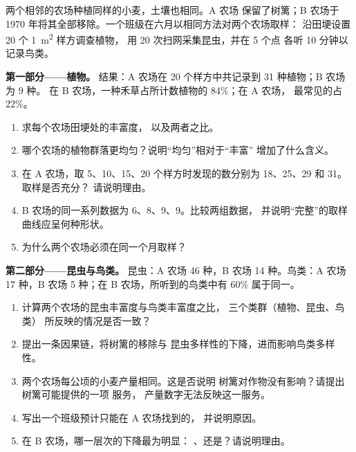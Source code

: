 \begin{problem}
\label{pb:g10:biodiversity-scales:1}
两个相邻的农场种植同样的小麦，土壤也相同。A 农场
保留了树篱；B 农场于 1970 年将其全部移除。一个班级在六月以相同方法对两个农场取样：
沿田埂设置 20 个 \qty{1}{m^2} 样方调查植物，
用 20 次扫网采集昆虫，并在 5 个点
各听 10 分钟以记录鸟类。

\medskip
\noindent\textbf{第一部分——植物。}
结果：A 农场在 20 个样方中共记录到 31 种植物；B 农场为 9 种。
在 B 农场，一种禾草占所计数植物的 84\%；在 A 农场，
最常见的占 22\%。
\begin{enumerate}
  \item 求每个农场田埂处的丰富度，
        以及两者之比。
  \item 哪个农场的植物群落更均匀？说明“均匀”相对于“丰富”
        增加了什么含义。
  \item 在 A 农场，取 5、10、15、20 个样方时发现的数分别为
        18、25、29 和 31。取样是否充分？
        请说明理由。
  \item B 农场的同一系列数据为 6、8、9、9。比较两组数据，
        并说明“完整”的取样曲线应呈何种形状。
  \item 为什么两个农场必须在同一个月取样？
\end{enumerate}

\medskip
\noindent\textbf{第二部分——昆虫与鸟类。}
昆虫：A 农场 46 种，B 农场 14 种。鸟类：A 农场 17 种，B 农场
5 种；在 B 农场，所听到的鸟类中有 60\% 属于同一。
\begin{enumerate}[resume]
  \item 计算两个农场的昆虫丰富度与鸟类丰富度之比，
        三个类群（植物、昆虫、鸟类）
        所反映的情况是否一致？
  \item 提出一条因果链，将树篱的移除与
        昆虫多样性的下降，进而影响鸟类多样性。
  \item 两个农场每公顷的小麦产量相同。这是否说明
        树篱对作物没有影响？请提出树篱可能提供的一项
        服务，
        产量数字无法反映这一服务。
  \item 写出一个班级预计只能在 A 农场找到的，
        并说明原因。
  \item 在 B 农场，哪一层次的下降最为明显：
        、还是？请说明理由。
\end{enumerate}


\end{problem}

